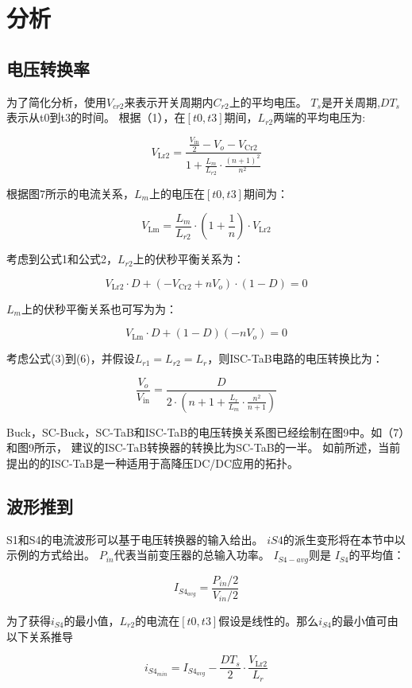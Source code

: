 \documentclass[12pt,a4paper]{report}
\begin{document}
\chapter{分析}
\section{电压转换率}
为了简化分析，使用$V_{cr2}$来表示开关周期内$C_{r2}$上的平均电压。
$T_s$是开关周期,$DT_s$表示从t0到t3的时间。
根据（1），在$[t0,t3]$期间，$L_{r2}$两端的平均电压为:

\begin{equation}
    V_{\mathrm{Lr} 2}=\frac{\frac{V_{\mathrm{in}}}{2}-V_{o}-V_{\mathrm{Cr} 2}}{1+\frac{L_{m}}{L_{r 2}} \cdot \frac{(n+1)^{2}}{n^{2}}}
\end{equation}

根据图7所示的电流关系，$L_m$上的电压在$[t0,t3]$期间为：

\begin{equation}
    V_{\mathrm{Lm}}=\frac{L_{m}}{L_{r 2}} \cdot\left(1+\frac{1}{n}\right) \cdot V_{\mathrm{Lr} 2}
\end{equation}

考虑到公式1和公式2，$L_{r2}$上的伏秒平衡关系为：

\begin{equation}
    V_{\mathrm{Lr} 2} \cdot D+\left(-V_{\mathrm{Cr} 2}+n V_{o}\right) \cdot(1-D)=0
\end{equation}

$L_{m}$上的伏秒平衡关系也可写为为：

\begin{equation}
    V_{\mathrm{Lm}} \cdot D+(1-D)\left(-n V_{o}\right)=0
\end{equation}

考虑公式(3)到(6)，并假设$L_{r 1}=L_{r 2}=L_{r}$，则ISC-TaB电路的电压转换比为：

\begin{equation}
    \frac{V_{o}}{V_{\mathrm{in}}}=\frac{D}{2 \cdot\left(n+1+\frac{L_{r}}{L_{m}} \cdot \frac{n^{2}}{n+1}\right)}
\end{equation}

Buck，SC-Buck，SC-TaB和ISC-TaB的电压转换关系图已经绘制在图9中。如（7）和图9所示，
建议的ISC-TaB转换器的转换比为SC-TaB的一半。 如前所述，当前提出的的ISC-TaB是一种适用于高降压DC/DC应用的拓扑。

\section{波形推到}

S1和S4的电流波形可以基于电压转换器的输入给出。 $iS4$的派生变形将在本节中以示例的方式给出。 $P_{in}$代表当前变压器的总输入功率。 $I_{S4-avg}$则是 $I_{S4}$的平均值：

\begin{equation}
    I_{S4_{avg}} = \frac{P_{in}/2}{V_{in}/2}
\end{equation}

为了获得$i_{S4}$的最小值，$L_{r2}$的电流在$[t0,t3]$假设是线性的。那么$i_{S4}$的最小值可由以下关系推导

\begin{equation}
    i_{S4_{min}} =I_{S4_{avg}}-\frac{D T_{s}}{2} \cdot \frac{V_{\mathrm{Lr} 2}}{L_{r}}
\end{equation}
\end{document}
